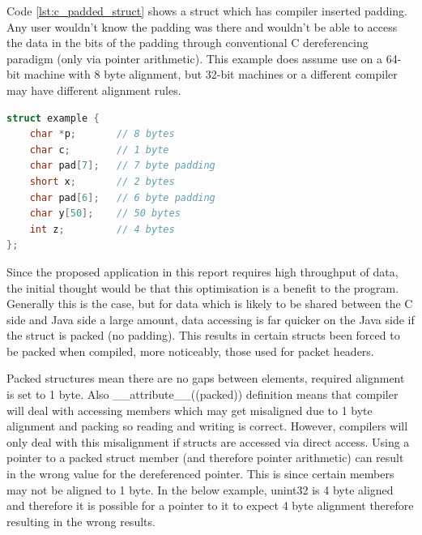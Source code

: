 \documentclass[final_report.tex]{subfiles}
\begin{document}

Code \ref{lst:c_padded_struct} shows a struct which has compiler inserted padding. Any user wouldn't know the padding was there and wouldn't be able to access the data in the bits of the padding through conventional C dereferencing paradigm (only via pointer arithmetic). This example does assume use on a 64-bit machine with 8 byte alignment, but 32-bit machines or a different compiler may have different alignment rules.

\begin{lstlisting}[language=C, caption={Example C Struct with compiler inserted padding}, label=lst:c_padded_struct]
struct example {
    char *p;       // 8 bytes
    char c;        // 1 byte
    char pad[7];   // 7 byte padding
    short x;       // 2 bytes
    char pad[6];   // 6 byte padding
    char y[50];    // 50 bytes
    int z;         // 4 bytes
};
\end{lstlisting}

Since the proposed application in this report requires high throughput of data, the initial thought would be that this optimisation is a benefit to the program. Generally this is the case, but for data which is likely to be shared between the C side and Java side a large amount, data accessing is far quicker  on the Java side if the struct is packed (no padding). This results in certain structs been forced to be packed when compiled, more noticeably, those used for packet headers.

Packed structures mean there are no gaps between elements, required alignment is set to 1 byte. Also \_\_attribute\_\_((packed)) definition means that compiler will deal with accessing members which may get misaligned due to 1 byte alignment and packing so reading and writing is correct. However, compilers will only deal with this misalignment if structs are accessed via direct access. Using a pointer to a packed struct member (and therefore pointer arithmetic) can result in the wrong value for the dereferenced pointer. This is since certain members may not be aligned to 1 byte. In the below example, unint32 is 4 byte aligned and therefore it is possible for a pointer to it to expect 4 byte alignment therefore resulting in the wrong results.
\end{document}
